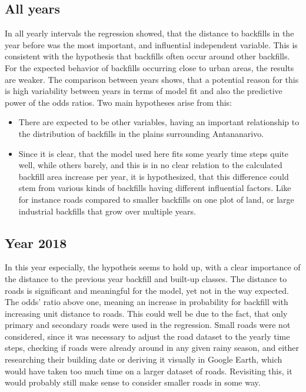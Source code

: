 \documentclass[11pt, A4, oneside]{report}
\begin{document}
\subsection{All years}
In all yearly intervals the regression showed, that the distance to backfills in the year before was the most important, and influential independent variable. This is consistent with the hypothesis that backfills often occur around other backfills. For the expected behavior of backfills occurring close to urban areas, the results are weaker. The comparison between years shows, that a potential reason for this is high variability between years in terms of model fit and also the predictive power of the odds ratios. Two main hypotheses arise from this: 
\begin{itemize}
\item There are expected to be other variables, having an important relationship to the distribution of backfills in the plains surrounding Antananarivo.

\item Since it is clear, that the model used here fits some yearly time steps quite well, while others barely, and this is in no clear relation to the calculated backfill area increase per year, it is hypothesized, that this difference could stem from various kinds of backfills having different influential factors. Like for instance roads compared to smaller backfills on one plot of land, or large industrial backfills that grow over multiple years.
\end{itemize}

\subsection{Year 2018}
In this year especially, the hypotheis seems to hold up, with a clear importance of the distance to the previous year backfill and built-up classes. The distance to roads is significant and meaningful for the model, yet not in the way expected. The odds' ratio above one, meaning an increase in probability for backfill with increasing unit distance to roads. This could well be due to the fact, that only primary and secondary roads were used in the regression. Small roads were not considered, since it was necessary to adjust the road dataset to the yearly time steps, checking if roads were already around in any given rainy season, and either researching their building date or deriving it visually in Google Earth, which would have taken too much time on a larger dataset of roads. Revisiting this, it would probably still make sense to consider smaller roads in some way.
\end{document}
